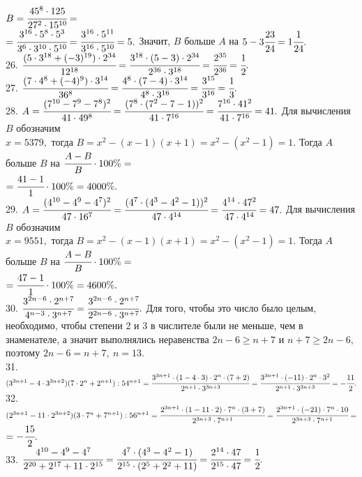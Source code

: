 \documentclass[12pt]{article}
\begin{document}
$B=\cfrac{45^8\cdot125}{27^2\cdot15^{10}}=$\\$=\cfrac{3^{16}\cdot5^{8}\cdot5^3}{3^6\cdot3^{10}\cdot5^{10}}=\cfrac{3^{16}\cdot5^{11}}{3^{16}\cdot5^{10}}=5.$ Значит, $B$ больше $A$ на $5-3\cfrac{23}{24}=1\cfrac{1}{24}.$\\
26. $\cfrac{(5\cdot3^{18}+(-3)^{19})\cdot2^{34}}{12^{18}}=\cfrac{3^{18}\cdot(5-3)\cdot2^{34}}{2^{36}\cdot3^{18}}=\cfrac{2^{35}}{2^{36}}=\cfrac{1}{2}.$\\
27. $\cfrac{(7\cdot4^8+(-4)^9)\cdot3^{14}}{36^8}=\cfrac{4^8\cdot(7-4)\cdot3^{14}}{4^8\cdot3^{16}}=\cfrac{3^{15}}{3^{16}}=\cfrac{1}{3}.$\\
28. $A=\cfrac{(7^{10}-7^9-7^8)^2}{41\cdot49^8}=\cfrac{(7^8\cdot(7^2-7-1))^2}{41\cdot7^{16}}=\cfrac{7^{16}\cdot41^2}{41\cdot7^{16}}=41.$ Для вычисления $B$ обозначим\\ $x=5379,$ тогда $B=x^2-(x-1)(x+1)=x^2-(x^2-1)=1.$ Тогда $A$ больше $B$ на $\cfrac{A-B}{B}\cdot100\%=$\\$=\cfrac{41-1}{1}\cdot100\%=4000\%.$\\
29. $A=\cfrac{(4^{10}-4^9-4^7)^2}{47\cdot16^7}=\cfrac{(4^7\cdot(4^3-4^2-1))^2}{47\cdot4^{14}}=\cfrac{4^{14}\cdot47^2}{47\cdot4^{14}}=47.$ Для вычисления $B$ обозначим\\ $x=9551,$ тогда $B=x^2-(x-1)(x+1)=x^2-(x^2-1)=1.$ Тогда $A$ больше $B$ на $\cfrac{A-B}{B}\cdot100\%=$\\$=\cfrac{47-1}{1}\cdot100\%=4600\%.$\\
30. $\cfrac{3^{2n-6}\cdot2^{n+7}}{4^{n-3}\cdot3^{n+7}}=\cfrac{3^{2n-6}\cdot2^{n+7}}{2^{2n-6}\cdot3^{n+7}}.$ Для того, чтобы это число было целым, необходимо, чтобы степени 2 и 3 в числителе были не меньше, чем в знаменателе, а значит выполнялись неравенства $2n-6\geqslant n+7$ и $n+7\geqslant 2n-6,$ поэтому $2n-6=n+7,\ n=13.$\\
31. $(3^{3n+1}-4\cdot3^{3n+2})(7\cdot2^n+2^{n+1}):54^{n+1}=\cfrac{3^{3n+1}\cdot(1-4\cdot3)\cdot2^n\cdot(7+2)}{2^{n+1}\cdot3^{3n+3}}=
\cfrac{3^{3n+1}\cdot(-11)\cdot2^n\cdot3^2}{2^{n+1}\cdot3^{3n+3}}=-\cfrac{11}{2}.$\\
32. $(2^{3n+1}-11\cdot2^{3n+2})(3\cdot7^n+7^{n+1}):56^{n+1}=\cfrac{2^{3n+1}\cdot(1-11\cdot2)\cdot7^n\cdot(3+7)}{2^{3n+3}\cdot7^{n+1}}=
\cfrac{2^{3n+1}\cdot(-21)\cdot7^n\cdot10}{2^{3n+3}\cdot7^{n+1}}=$\\$=-\cfrac{15}{2}.$\\
33. $\cfrac{4^{10}-4^9-4^7}{2^{20}+2^{17}+11\cdot2^{15}}=\cfrac{4^7\cdot(4^3-4^2-1)}{2^{15}\cdot(2^5+2^2+11)}=
\cfrac{2^{14}\cdot47}{2^{15}\cdot47}=\cfrac{1}{2}.$\\
\end{document}

